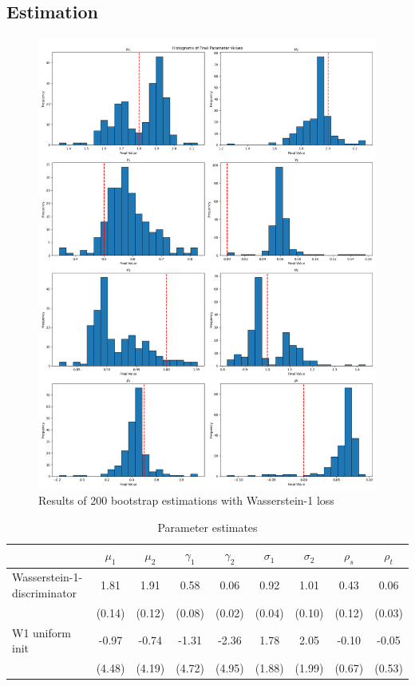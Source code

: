 \subsection{Estimation}

\begin{figure}
    \includegraphics[width=\textwidth]{./Images/main_case_histograms.png}
    \caption{Results of 200 bootstrap estimations with Wasserstein-1 loss}
    \label{fig:main_case_histrograms}
\end{figure}

\begin{table}
    \centering
    \begin{tabular}{|l|cccccccc} %
    \hline
    & $\mu_1$ & $\mu_2$ & $\gamma_1$ & $\gamma_2$ & $\sigma_1$ & $\sigma_2$ & $\rho_s$ & $\rho_t$ \\
    \hline
    Wasserstein-1-discriminator & 1.81 & 1.91 & 0.58 & 0.06 & 0.92 & 1.01 & 0.43 & 0.06 \\
    & (0.14) & (0.12) & (0.08) & (0.02) & (0.04) & (0.10) & (0.12) & (0.03) \\
    \hline
    W1 uniform init & -0.97 & -0.74 & -1.31 & -2.36 & 1.78 & 2.05 & -0.10 & -0.05 \\
    & (4.48) & (4.19) & (4.72) & (4.95) & (1.88) & (1.99) & (0.67) & (0.53) \\
    \hline
    \end{tabular}
    \caption{Parameter estimates}
    \label{tab:parameter_estimates}
\end{table}

